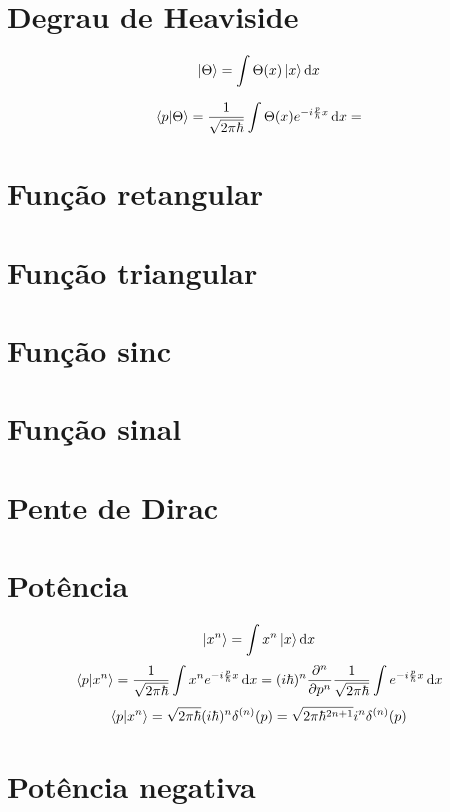 \documentclass[report,14pt,openright,oneside,a4paper,brazil]{abntex2}
\newcommand{\abrir}[2]{\int{#1}\ket{#2}\dd{#2}}
\newcommand{\qfourier}[1]{\frac{1}{\sqrt{2\pi\hbar}}\int{#1} e^{-i \frac{p}{\hbar} x} \dd{x}}
\begin{document}
\section{Degrau de Heaviside}

\begin{equation}
	\ket{\Theta}=\abrir{\Theta (x)}{x}
\end{equation}

\begin{equation}
	\braket{p}{\Theta} = \qfourier{\Theta (x)}=
\end{equation}

\section{Função retangular}

\section{Função triangular}

\section{Função sinc}

\section{Função sinal}

\section{Pente de Dirac}

\section{Potência}
\begin{equation}
    \ket{x^n}=\abrir{x^n}{x}
\end{equation}
\begin{equation}
    \braket{p}{x^n}=\qfourier{x^n}
    =(i\hbar)^n\pdv[n]{}{p} \qfourier{}
\end{equation}
\begin{equation}
    \braket{p}{x^n}=\sqrt{2\pi\hbar}(i\hbar)^n\delta^{(n)}(p)=\sqrt{2\pi\hbar^{2n+1}}i^n\delta^{(n)}(p)
\end{equation}

\section{Potência negativa}
\end{document}
